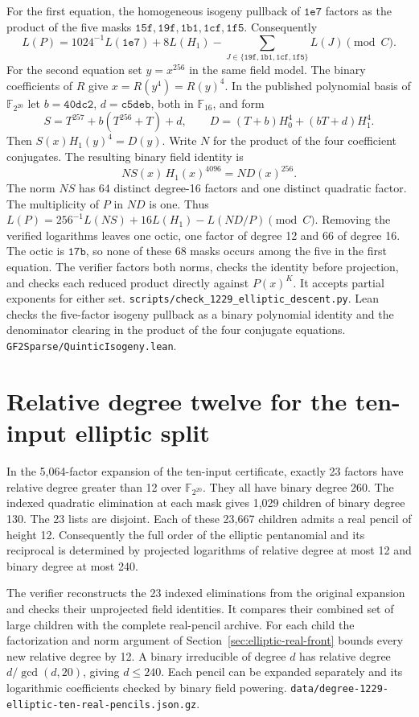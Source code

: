 \documentclass[11pt]{article}
\begin{document}
For the first equation, the homogeneous isogeny pullback of
\(\mathtt{1e7}\) factors as the product of the five masks
\(\mathtt{15f},\mathtt{19f},\mathtt{1b1},\mathtt{1cf},\mathtt{1f5}\).
Consequently
\[
 L(P)=1024^{-1}L(\mathtt{1e7})+8L(H_1)-
 \sum_{J\in\{\mathtt{19f},\mathtt{1b1},\mathtt{1cf},\mathtt{1f5}\}}L(J)
 \pmod C.
\]
For the second equation set \(y=x^{256}\) in the same field model.
The binary coefficients of \(R\) give \(x=R(y^4)=R(y)^4\).
In the published polynomial basis of \(\mathbb F_{2^{20}}\) let
\(b=\mathtt{40dc2}\), \(d=\mathtt{c5deb}\), both in
\(\mathbb F_{16}\), and form
\[
 S=T^{257}+b(T^{256}+T)+d,\qquad
 D=(T+b)H_0^4+(bT+d)H_1^4.
\]
Then \(S(x)H_1(y)^4=D(y)\). Write \(N\) for the product of the
four coefficient conjugates. The resulting binary field identity is
\[
 NS(x)\,H_1(x)^{4096}=ND(x)^{256}.
\]
The norm \(NS\) has 64 distinct degree-16 factors and one distinct
quadratic factor. The multiplicity of \(P\) in \(ND\) is one.
Thus \(L(P)=256^{-1}L(NS)+16L(H_1)-L(ND/P)\pmod C\).
Removing the verified logarithms leaves one octic, one factor of
degree 12 and 66 of degree 16. The octic is \(\mathtt{17b}\),
so none of these 68 masks occurs among the five in the first
equation. The verifier factors both norms, checks the identity
before projection, and checks each reduced product directly
against \(P(x)^K\). It accepts partial exponents for either set.
\nolinkurl{scripts/check_1229_elliptic_descent.py}.
Lean checks the five-factor isogeny pullback as a binary polynomial
identity and the denominator clearing in the product of the four
conjugate equations. \nolinkurl{GF2Sparse/QuinticIsogeny.lean}.

\section{Relative degree twelve for the ten-input elliptic split}
\label{sec:elliptic-real-twelve}
In the 5,064-factor expansion of the ten-input certificate,
exactly 23 factors have relative degree greater than 12 over
\(\mathbb F_{2^{20}}\). They all have binary degree 260.
The indexed quadratic elimination at each mask gives 1,029
children of binary degree 130. The 23 lists are disjoint.
Each of these 23,667 children admits a real pencil of height 12.
Consequently the full order of the elliptic pentanomial and its
reciprocal is determined by projected logarithms of relative
degree at most 12 and binary degree at most 240.

The verifier reconstructs the 23 indexed eliminations from the
original expansion and checks their unprojected field identities.
It compares their combined set of large children with the complete
real-pencil archive. For each child the factorization and norm
argument of Section~\ref{sec:elliptic-real-front} bounds every new
relative degree by 12. A binary irreducible of degree \(d\) has
relative degree \(d/\gcd(d,20)\), giving \(d\le240\).
Each pencil can be expanded separately and its logarithmic
coefficients checked by binary field powering.
\nolinkurl{data/degree-1229-elliptic-ten-real-pencils.json.gz}.
\end{document}
